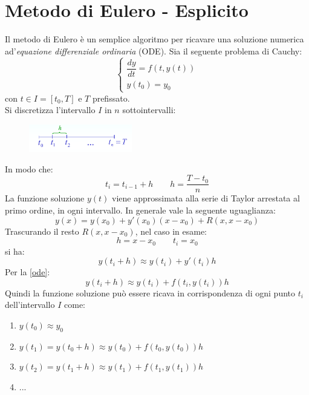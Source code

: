 \chapter{Metodo di Eulero - Esplicito}
Il metodo di Eulero è un semplice algoritmo per ricavare una soluzione numerica ad'\textit{equazione differenziale ordinaria} (ODE).
Sia il seguente problema di Cauchy:
\begin{equation}
	\label{ode}
	\begin{cases}
		\dfrac{dy}{dt} = f(t,y(t)) \\[0.2cm]
		y(t_{0}) = y_{0}
	\end{cases}
\end{equation}
con $t \in I = [t_{0},T]$ e $T$ prefissato.
\\Si discretizza l'intervallo $I$ in $n$ sottointervalli:
\begin{figure}[H]
	\centering
	\includegraphics[width=0.4\textwidth]{img/discretizzazione.png}
\end{figure}
In modo che:
\begin{equation*}
	t_{i} = t_{i-1}+h \qquad h = \dfrac{T-t_{0}}{n}
\end{equation*}
La funzione soluzione $y(t)$ viene approssimata alla serie di Taylor arrestata al primo ordine, in ogni intervallo. In generale vale la seguente uguaglianza:
\begin{equation*}
	y(x) = y(x_{0}) + y'(x_{0})(x-x_{0}) + R(x, x-x_{0})
\end{equation*}
Trascurando il resto $R(x, x-x_{0})$, nel caso in esame:
\begin{equation*}
	h = x-x_{0} \qquad t_{i}=x_{0}
\end{equation*}
si ha:
\begin{equation*}
	y(t_{i}+h) \approx y(t_{i}) + y'(t_{i})h
\end{equation*}
Per la \ref{ode}:
\begin{equation}
	y(t_{i}+h) \approx y(t_{i}) + f(t_{i}, y(t_{i}))h
\end{equation}
Quindi la funzione soluzione può essere ricava in corrispondenza di ogni punto $t_i$ dell'intervallo $I$ come:
\begin{enumerate}
	\item $y(t_{0}) \approx y_{0}$
	\item $ y(t_1) = y(t_0+h) \approx y(t_{0}) + f(t_{0}, y(t_0)) h$
	\item $y(t_2) = y(t_1+h) \approx  y(t_{1}) + f(t_{1}, y(t_1)) h$
\item ...
\end{enumerate}
